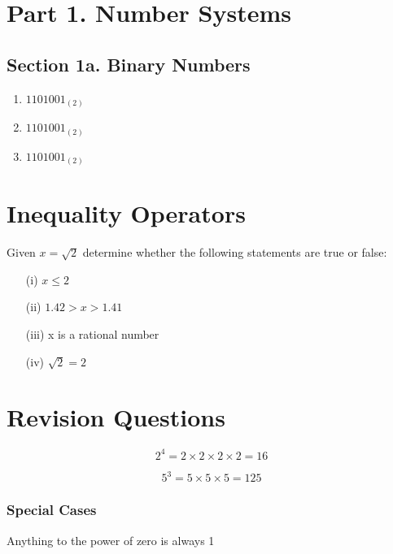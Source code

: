 \documentclass[]{report}
\begin{document}
\begin{enumerate}
\section*{Part 1. Number Systems}

\subsection*{Section 1a. Binary Numbers}

\begin{enumerate}
\item $1101001_{(2)}$
\item $1101001_{(2)}$
\item $1101001_{(2)}$
\end{enumerate}
\section{Inequality Operators}


Given $x = \sqrt{2}$ determine whether the following statements are true or false:

\begin{itemize}
\item[(i)] $x \leq 2$
\item[(ii)] $1.42 > x > 1.41$
\item[(iii)] x is a rational number
\item[(iv)] $\sqrt{2} = 2$
\end{itemize}

\section{Revision Questions}



\[  2^ 4 = 2 \times 2 \times 2 \times 2 = 16 \]

\[  5^ 3 = 5 \times 5 \times 5 =125 \]

\subsubsection{Special Cases}

Anything to the power of zero is always 1


\end{enumerate}
\end{document}
